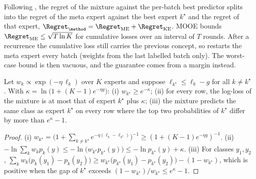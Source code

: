 Following \citet{zhao2025mooe}, the regret of the mixture against the per-batch best predictor splits into the regret of
the meta expert against the best expert $k^\star$ and the regret of that expert,
$\Regret_{\method}=\Regret_{\mathrm{ME}}+\Regret_{\mathrm{KE}}$. MOOE bounds $\Regret_{\mathrm{ME}}\le\sqrt{T\ln K}$ for
cumulative losses over an interval of $T$ rounds. After a recurrence the cumulative loss still carries the previous
concept, so \method{} restarts the meta expert every batch (weights from the last labelled batch only). The
worst-case bound is then vacuous, and the guarantee comes from a margin instead.

\begin{lemma}[Margin]\label{lem:margin}
Let $w_k\propto\exp(-\eta\,\ell_k)$ over $K$ experts and suppose $\ell_{k^\star}\le\ell_k-g$ for all $k\ne k^\star$. With
$\kappa=\ln\bigl(1+(K-1)e^{-\eta g}\bigr)$: (i) $w_{k^\star}\ge e^{-\kappa}$; (ii) for every row, the log-loss of the
mixture is at most that of expert $k^\star$ plus $\kappa$; (iii) the mixture predicts the same class as expert
$k^\star$ on every row where the top two probabilities of $k^\star$ differ by more than $e^{\kappa}-1$.
\end{lemma}
\begin{proof}
(i) $w_{k^\star}=\bigl(1+\sum_{k\ne k^\star}e^{-\eta(\ell_k-\ell_{k^\star})}\bigr)^{-1}\ge(1+(K-1)e^{-\eta g})^{-1}$.
(ii) $-\ln\sum_kw_kp_k(y)\le-\ln\bigl(w_{k^\star}p_{k^\star}(y)\bigr)\le-\ln p_{k^\star}(y)+\kappa$.
(iii) For classes $y_1,y_2$, $\sum_kw_k\bigl(p_k(y_1)-p_k(y_2)\bigr)\ge w_{k^\star}\bigl(p_{k^\star}(y_1)-p_{k^\star}(y_2)\bigr)
-(1-w_{k^\star})$, which is positive when the gap of $k^\star$ exceeds $(1-w_{k^\star})/w_{k^\star}\le e^{\kappa}-1$.
\end{proof}

